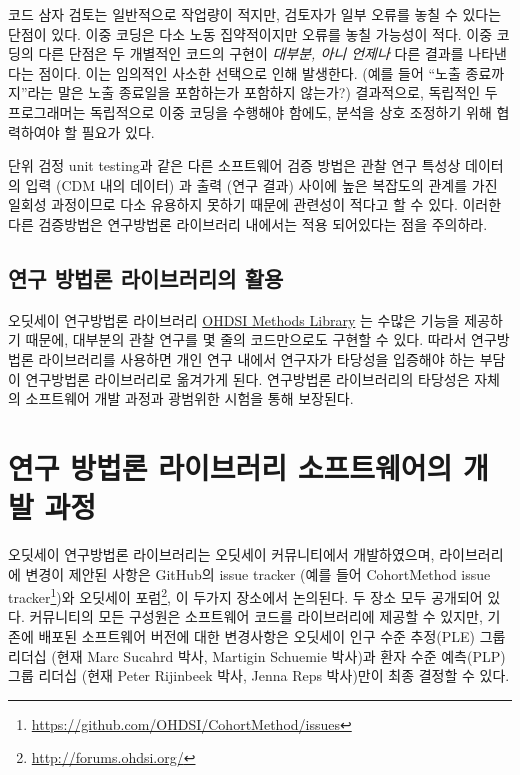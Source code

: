 \documentclass[10.5pt]{book}
\let\rmarkdownfootnote\footnote%
\def\footnote{\protect\rmarkdownfootnote}
\theoremstyle{definition}
\theoremstyle{definition}
\theoremstyle{definition}
\theoremstyle{remark}
\begin{document}
코드 삼자 검토는 일반적으로 작업량이 적지만, 검토자가 일부 오류를 놓칠
수 있다는 단점이 있다. 이중 코딩은 다소 노동 집약적이지만 오류를 놓칠
가능성이 적다. 이중 코딩의 다른 단점은 두 개별적인 코드의 구현이
\emph{대부분, 아니 언제나} 다른 결과를 나타낸다는 점이다. 이는 임의적인
사소한 선택으로 인해 발생한다. (예를 들어 ``노출 종료까지''라는 말은
노출 종료일을 포함하는가 포함하지 않는가?) 결과적으로, 독립적인 두
프로그래머는 독립적으로 이중 코딩을 수행해야 함에도, 분석을 상호
조정하기 위해 협력하여야 할 필요가 있다.

단위 검정 unit testing과 같은 다른 소프트웨어 검증 방법은 관찰 연구
특성상 데이터의 입력 (CDM 내의 데이터) 과 출력 (연구 결과) 사이에 높은
복잡도의 관계를 가진 일회성 과정이므로 다소 유용하지 못하기 때문에
관련성이 적다고 할 수 있다. 이러한 다른 검증방법은 연구방법론 라이브러리
내에서는 적용 되어있다는 점을 주의하라.

\subsection{연구 방법론 라이브러리의 활용}\label{---}

오딧세이 연구방법론 라이브러리
\href{https://ohdsi.github.io/MethodsLibrary/}{OHDSI Methods Library} 는
수많은 기능을 제공하기 때문에, 대부분의 관찰 연구를 몇 줄의 코드만으로도
구현할 수 있다. 따라서 연구방법론 라이브러리를 사용하면 개인 연구 내에서
연구자가 타당성을 입증해야 하는 부담이 연구방법론 라이브러리로 옮겨가게
된다. 연구방법론 라이브러리의 타당성은 자체의 소프트웨어 개발 과정과
광범위한 시험을 통해 보장된다.

\section{연구 방법론 라이브러리 소프트웨어의 개발 과정}\label{-----}

오딧세이 연구방법론 라이브러리는 오딧세이 커뮤니티에서 개발하였으며,
라이브러리에 변경이 제안된 사항은 GitHub의 issue tracker (예를 들어
CohortMethod issue tracker\footnote{\url{https://github.com/OHDSI/CohortMethod/issues}})와
오딧세이 포럼\footnote{\url{http://forums.ohdsi.org/}}, 이 두가지
장소에서 논의된다. 두 장소 모두 공개되어 있다. 커뮤니티의 모든 구성원은
소프트웨어 코드를 라이브러리에 제공할 수 있지만, 기존에 배포된
소프트웨어 버전에 대한 변경사항은 오딧세이 인구 수준 추정(PLE) 그룹
리더십 (현재 Marc Sucahrd 박사, Martigin Schuemie 박사)과 환자 수준
예측(PLP) 그룹 리더십 (현재 Peter Rijinbeek 박사, Jenna Reps 박사)만이
최종 결정할 수 있다.
\end{document}
